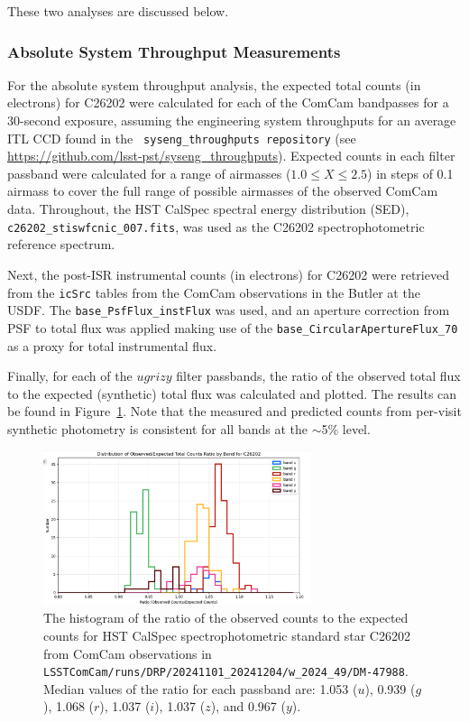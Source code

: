 These two analyses are discussed below.

\subsubsection{Absolute System Throughput Measurements}

For the absolute system throughput analysis, the expected total counts
(in electrons) for C26202 were calculated for each of the ComCam
bandpasses for a 30-second exposure, assuming the engineering system
throughputs for an average ITL CCD found in the {\tt
  syseng\_throughputs repository} (see
\url{https://github.com/lsst-pst/syseng\_throughputs}). Expected
counts in each filter passband were calculated for a range of
airmasses ($1.0 \leq X \leq 2.5$) in steps of 0.1 airmass to cover the
full range of possible airmasses of the observed ComCam data.
Throughout, the HST CalSpec spectral energy distribution (SED), {\tt
  c26202\_stiswfcnic\_007.fits}, was used as the C26202
spectrophotometric reference spectrum.

Next, the post-ISR instrumental counts (in electrons) for C26202 were
retrieved from the {\tt icSrc} tables from the ComCam observations in
the Butler at the USDF.  The {\tt base\_PsfFlux\_instFlux} was used,
and an aperture correction from PSF to total flux was applied making
use of the {\tt base\_CircularApertureFlux\_70} as a proxy for total
instrumental flux.

Finally, for each of the $ugrizy$ filter passbands, the ratio of the
observed total flux to the expected (synthetic) total flux was
calculated and plotted.  The results can be found in
Figure~\ref{fig:c26202_throughputs}.  Note that the measured and
predicted counts from per-visit synthetic photometry is consistent for
all bands at the $\sim$5\% level.

\begin{figure}
  \begin{center}
    \includegraphics[width=0.7\textwidth]{photometric_calibration_figures/LSSTComCam_Absolute_Throughputs_20241210.png}
  \end{center}
  \caption{\label{fig:c26202_throughputs}The histogram of the ratio of
    the observed counts to the expected counts for HST CalSpec
    spectrophotometric standard star C26202 from ComCam observations
    in {\tt
      LSSTComCam/runs/DRP/20241101\_20241204/w\_2024\_49/DM-47988}.
    Median values of the ratio for each passband are: 1.053 ($u$),
    0.939 ($g$), 1.068 ($r$), 1.037 ($i$), 1.037 ($z$), and 0.967
    ($y$).}
\end{figure}


